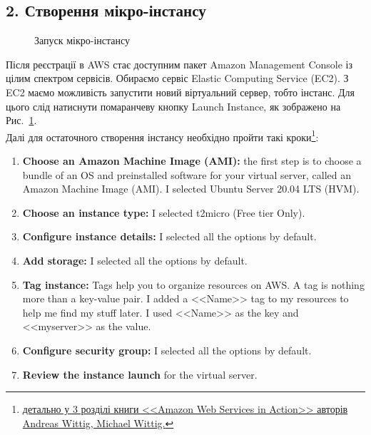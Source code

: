\documentclass[a4paper,14pt]{extarticle}
\begin{document}
\subsection*{2. Створення мікро-інстансу}

\begin{figure}
    \vspace{-1.7cm}
    \caption{Запуск мікро-інстансу}
    \label{fig:instance}
\end{figure}

Після реєстрації в AWS стає доступним пакет Amazon Management Console 
із цілим спектром сервісів. Обираємо сервіс Elastic Computing 
Service (EC2). З EC2 маємо можливість запустити новий віртуальний 
сервер, тобто інстанс. Для цього слід натиснути помаранчеву кнопку 
Launch Instance, як зображено на Рис.~\ref{fig:instance}. \\

Далі для остаточного створення інстансу необхідно пройти такі кроки\footnote
{\href{https://drive.google.com/file/d/1bw8HWLhrWmIfW7_4GhIvwFP40NiJpqZz/view}
{детально у 3 розділі книги <<Amazon Web Services in Action>> 
авторів Andreas Wittig, Michael Wittig.}}:

\begin{enumerate}
    \item \textbf{Choose an Amazon Machine Image (AMI):} 
    the first step is to choose a bundle of an OS and 
    preinstalled software for your virtual server, 
    called an Amazon Machine Image (AMI). I selected 
    Ubuntu Server 20.04 LTS (HVM).
    \item \textbf{Choose an instance type:} I selected t2micro (Free tier Only).
    \item \textbf{Configure instance details:} I selected all the options by default.
    \item \textbf{Add storage:} I selected all the options by default.
    \item \textbf{Tag instance:} Tags help you to organize resources on AWS. A tag
    is nothing more than a key-value pair. I added a <<Name>> tag to 
    my resources to help me find my stuff later. I used <<Name>> as 
    the key and <<myserver>> as the value.
    \item \textbf{Configure security group:} I selected all the options by default.
    \item \textbf{Review the instance launch} for the virtual server.
\end{enumerate}
\end{document}
